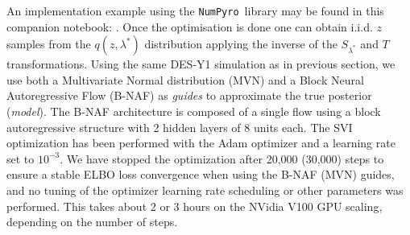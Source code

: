 \documentclass[twocolumn,twocolappendix,nofootinbib,iop]{openjournal}
\newcommand{\nblink}[1]{\href{https://github.com/DifferentiableUniverseInitiative/jax-cosmo-paper/blob/master/notebooks/#1.ipynb}{\faFileCodeO}}
\newcommand{\FrL}[1]{{\color{cyan}FL: #1}}
\newcommand{\JZ}[1]{{\color{purple}JZ: #1}}
\newcommand{\JEC}[1]{{\color{magenta}JEC: #1}}
\newcommand{\numpyro}{\texttt{NumPyro}}
\begin{document}
%
An implementation example using the \numpyro\ library may be found in this companion notebook: \nblink{DES_Y1_SVI_and_NeutraReparam}.
%
Once the optimisation is done one can obtain  i.i.d. $z$ samples from the $q(z,\lambda^\ast)$ distribution applying the inverse of the $S_{\lambda^\ast}$ and $T$ transformations. Using the same DES-Y1 simulation as in previous section, we use both a Multivariate Normal distribution (MVN) and a Block Neural Autoregressive Flow (B-NAF) \citep{pmlr-v115-de-cao20a} as \textit{guides} to approximate the true posterior (\textit{model}). The B-NAF architecture is composed of a single flow using a block autoregressive structure with 2 hidden layers of 8 units each. The SVI optimization has been performed with the Adam optimizer \citep{KingmaB14} and a learning rate set to $10^{-3}$. We have stopped the optimization after 20,000 (30,000) steps to ensure a stable ELBO loss convergence when using the B-NAF (MVN) guides, and no tuning of the optimizer learning rate scheduling or other parameters was performed. This takes about 2 or 3 hours on the NVidia V100 GPU scaling, depending on the number of steps.  
\end{document}
